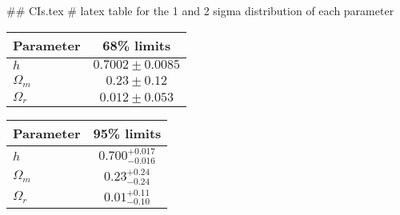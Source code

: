 ## CIs.tex
# latex table for the 1 and 2 sigma distribution of each parameter

\begin{tabular} { l  c}
 Parameter &  68\% limits\\
\hline
{\boldmath$h              $} & $0.7002\pm 0.0085          $\\
{\boldmath$\Omega_m       $} & $0.23\pm 0.12              $\\
{\boldmath$\Omega_r       $} & $0.012\pm 0.053            $\\
\hline
\end{tabular}

\begin{tabular} { l  c}
 Parameter &  95\% limits\\
\hline
{\boldmath$h              $} & $0.700^{+0.017}_{-0.016}   $\\
{\boldmath$\Omega_m       $} & $0.23^{+0.24}_{-0.24}      $\\
{\boldmath$\Omega_r       $} & $0.01^{+0.11}_{-0.10}      $\\
\hline
\end{tabular}
